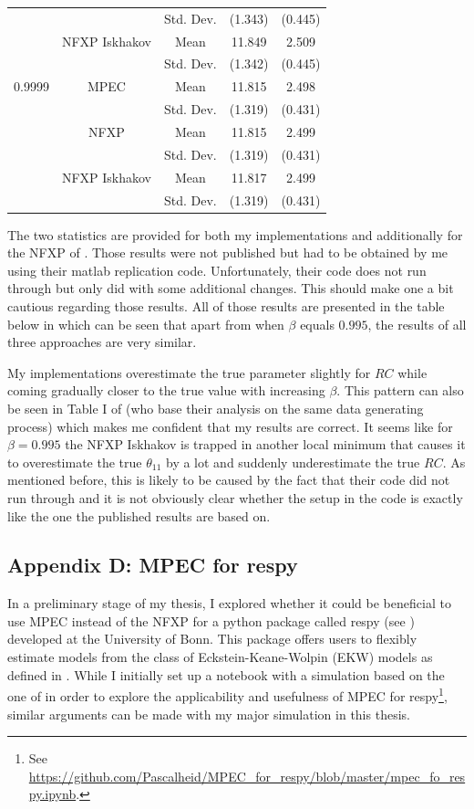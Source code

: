 \begin{table}[!t]
\begin{tabular}{l c c c c}
		& & Std. Dev. & (1.343) & (0.445) \\
		& NFXP Iskhakov & Mean & 11.849 & 2.509 \\
		& & Std. Dev. & (1.342) & (0.445) \\ \midrule
		0.9999 & MPEC & Mean & 11.815 & 2.498 \\
		& & Std. Dev. & (1.319) & (0.431) \\
		& NFXP & Mean & 11.815 & 2.499 \\
		& & Std. Dev. & (1.319) & (0.431) \\
		& NFXP Iskhakov & Mean & 11.817	& 2.499 \\
		& & Std. Dev. & (1.319) & (0.431) \\ \bottomrule
	\end{tabular}
\end{table}

The two statistics are provided for both my implementations and additionally for the NFXP of \cite{Iskhakov.2016}. Those results were not published but had to be obtained by me using their matlab replication code. Unfortunately, their code does not run through but only did with some additional changes. This should make one a bit cautious regarding those results. All of those results are presented in the table below in which can be seen that apart from when $\beta$ equals $0.995$, the results of all three approaches are very similar.

My implementations overestimate the true parameter slightly for $RC$ while coming gradually closer to the true value with increasing $\beta$. This pattern can also be seen in Table I of \cite{Su.Judd.2012} (who base their analysis on the same data generating process) which makes me confident that my results are correct. It seems like for $\beta = 0.995$ the NFXP Iskhakov is trapped in another local minimum that causes it to overestimate the true $\theta_{11}$ by a lot and suddenly underestimate the true $RC$. As mentioned before, this is likely to be caused by the fact that their code did not run through and it is not obviously clear whether the setup in the code is exactly like the one the published results are based on.

\subsection{Appendix D: MPEC for respy} \label{appendixD}

In a preliminary stage of my thesis, I explored whether it could be beneficial to use MPEC instead of the NFXP for a python package called respy (see \cite{Gabler.2020}) developed at the University of Bonn. This package offers users to flexibly estimate models from the class of Eckstein-Keane-Wolpin (EKW) models as defined in \cite{Aguirregabiri.2010}. While I initially set up a notebook with a simulation based on the one of \cite{Iskhakov.2016} in order to explore the applicability and usefulness of MPEC for respy\footnote{ See \url{https://github.com/Pascalheid/MPEC_for_respy/blob/master/mpec_fo_respy.ipynb}.}, similar arguments can be made with my major simulation in this thesis.

